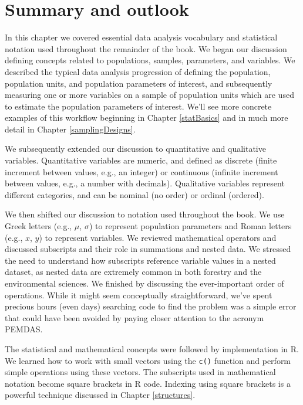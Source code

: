 \documentclass[
  11pt,
]{krantz}
\theoremstyle{definition}
\theoremstyle{definition}
\theoremstyle{definition}
\theoremstyle{definition}
\theoremstyle{remark}
\begin{document}
\hypertarget{summaryNotation}{%
\section{Summary and outlook}\label{summaryNotation}}

In this chapter we covered essential data analysis vocabulary and statistical notation used throughout the remainder of the book. We began our discussion defining concepts related to populations, samples, parameters, and variables. We described the typical data analysis progression of defining the population, population units, and population parameters of interest, and subsequently measuring one or more variables on a sample of population units which are used to estimate the population parameters of interest. We'll see more concrete examples of this workflow beginning in Chapter \ref{statBasics} and in much more detail in Chapter \ref{samplingDesigns}.

We subsequently extended our discussion to quantitative and qualitative variables. Quantitative variables are numeric, and defined as discrete (finite increment between values, e.g., an integer) or continuous (infinite increment between values, e.g., a number with decimals). Qualitative variables represent different categories, and can be nominal (no order) or ordinal (ordered).

We then shifted our discussion to notation used throughout the book. We use Greek letters (e.g., \(\mu\), \(\sigma\)) to represent population parameters and Roman letters (e.g., \(x\), \(y\)) to represent variables. We reviewed mathematical operators and discussed subscripts and their role in summations and nested data. We stressed the need to understand how subscripts reference variable values in a nested dataset, as nested data are extremely common in both forestry and the environmental sciences. We finished by discussing the ever-important order of operations. While it might seem conceptually straightforward, we've spent precious hours (even days) searching code to find the problem was a simple error that could have been avoided by paying closer attention to the acronym PEMDAS.

The statistical and mathematical concepts were followed by implementation in R. We learned how to work with small vectors using the \texttt{c()} function and perform simple operations using these vectors. The subscripts used in mathematical notation become square brackets in R code. Indexing using square brackets is a powerful technique discussed in Chapter \ref{structures}.
\end{document}
